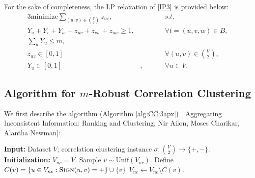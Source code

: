 
For the sake of completeness, the LP relaxation of \ref{IP3} is provided below:
\begin{alignat}{3}
    \text{minimize} \sum_{(u,v) \in \binom{V}{2}} z_{uv},& &&s.t. \label{LP3}\tag{LP3}\\
    Y_u + Y_v + Y_w + z_{uv} + z_{vw} + z_{uw} \ge 1,& &&\forall t = (u,v,w) \in B , \nonumber\\
    \sum_{u} Y_u \le m, & \nonumber\\
	z_{uv} \in [0,1]&\qquad && \forall (u,v) \in \binom{V}{2}, \label{eq:012} \\
	Y_u \in [0,1]&, && \forall u \in V. \label{eq:0022}
\end{alignat}

\subsection{Algorithm for $m$-Robust Correlation Clustering}

We first describe the algorithm (Algorithm \ref{alg:CC:3apx}) [{\color{red} Aggregating Inconsistent Information: Ranking and Clustering, Nir Ailon, Moses Charikar, Alantha Newman}]:
\begin{algorithm}
\caption{${\sf CharikarCC}(V,\sigma)$}
\label{alg:CharikarCC}
\begin{algorithmic}
\State \textbf{Input:} Dataset $V$; correlation clustering instance $\sigma : \binom{V}{2} \to \{ +,- \}$.
\State \textbf{Initialization:} $V_{nc} = V$. 
\State Sample $v \sim \mathrm{Unif} (V_{nc})$.
\State Define $C(v) = \{ u \in V_{nc} : \textsc{Sign} (u,v) = +\} \cup \{ v \}$ 
\State $V_{nc} \gets V_{nc} \setminus C(v)$.
\EndWhile
\end{algorithmic}
\end{algorithm}

